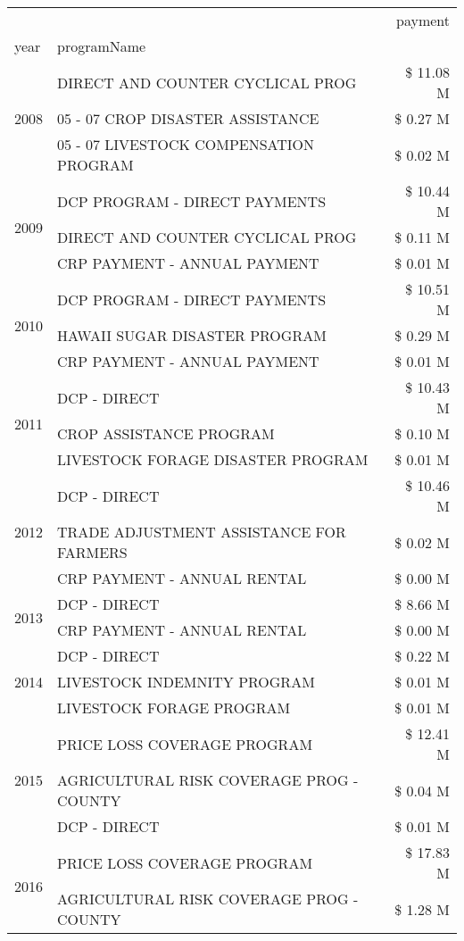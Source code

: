 \begin{tabular}{llr}
\toprule
 &  & payment \\
year & programName &  \\
\midrule
\multirow[t]{3}{*}{2008} & DIRECT AND COUNTER CYCLICAL PROG & \$ 11.08 M \\
 & 05 - 07 CROP DISASTER ASSISTANCE & \$ 0.27 M \\
 & 05 - 07 LIVESTOCK COMPENSATION PROGRAM & \$ 0.02 M \\
\cline{1-3}
\multirow[t]{3}{*}{2009} & DCP PROGRAM - DIRECT PAYMENTS & \$ 10.44 M \\
 & DIRECT AND COUNTER CYCLICAL PROG & \$ 0.11 M \\
 & CRP PAYMENT - ANNUAL PAYMENT & \$ 0.01 M \\
\cline{1-3}
\multirow[t]{3}{*}{2010} & DCP PROGRAM - DIRECT PAYMENTS & \$ 10.51 M \\
 & HAWAII SUGAR DISASTER PROGRAM & \$ 0.29 M \\
 & CRP PAYMENT - ANNUAL PAYMENT & \$ 0.01 M \\
\cline{1-3}
\multirow[t]{3}{*}{2011} & DCP - DIRECT & \$ 10.43 M \\
 & CROP ASSISTANCE PROGRAM & \$ 0.10 M \\
 & LIVESTOCK FORAGE DISASTER PROGRAM & \$ 0.01 M \\
\cline{1-3}
\multirow[t]{3}{*}{2012} & DCP - DIRECT & \$ 10.46 M \\
 & TRADE ADJUSTMENT ASSISTANCE FOR FARMERS & \$ 0.02 M \\
 & CRP PAYMENT - ANNUAL RENTAL & \$ 0.00 M \\
\cline{1-3}
\multirow[t]{2}{*}{2013} & DCP - DIRECT & \$ 8.66 M \\
 & CRP PAYMENT - ANNUAL RENTAL & \$ 0.00 M \\
\cline{1-3}
\multirow[t]{3}{*}{2014} & DCP - DIRECT & \$ 0.22 M \\
 & LIVESTOCK INDEMNITY PROGRAM & \$ 0.01 M \\
 & LIVESTOCK FORAGE PROGRAM & \$ 0.01 M \\
\cline{1-3}
\multirow[t]{3}{*}{2015} & PRICE LOSS COVERAGE PROGRAM & \$ 12.41 M \\
 & AGRICULTURAL RISK COVERAGE PROG - COUNTY & \$ 0.04 M \\
 & DCP - DIRECT & \$ 0.01 M \\
\cline{1-3}
\multirow[t]{3}{*}{2016} & PRICE LOSS COVERAGE PROGRAM & \$ 17.83 M \\
 & AGRICULTURAL RISK COVERAGE PROG - COUNTY & \$ 1.28 M \\

\end{tabular}
